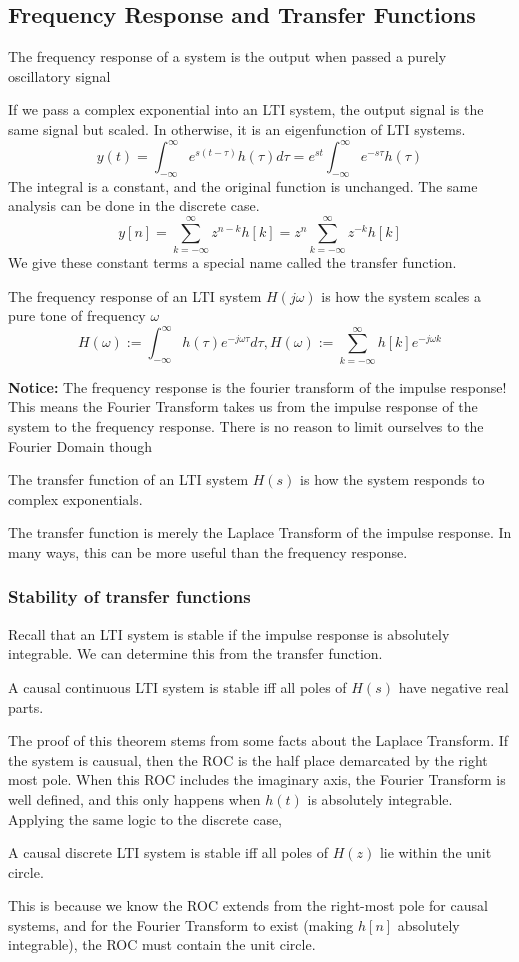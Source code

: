 \subsection{Frequency Response and Transfer Functions}
\begin{definition}
    The frequency response of a system is the output when passed a purely oscillatory signal
\end{definition}
If we pass a complex exponential into an LTI system, the output signal is the same signal but scaled.
In otherwise, it is an eigenfunction of LTI systems.
\[
y(t)=\int_{-\infty}^{\infty}{e^{s(t-\tau)}h(\tau)d\tau}=e^{st}\int_{-\infty}^{\infty}{e^{-s\tau}h(\tau)}
\]
The integral is a constant, and the original function is unchanged.
The same analysis can be done in the discrete case.
\[
y[n]=\sum_{k=-\infty}^{\infty}z^{n-k}h[k] = z^n \sum_{k=-\infty}^{\infty}z^{-k}h[k]
\]
We give these constant terms a special name called the transfer function.
\begin{definition}
    The frequency response of an LTI system $H(j\omega)$ is how the system scales a pure tone of frequency $\omega$
    \[
H(\omega):=\int_{-\infty}^{\infty}{h(\tau)e^{-j\omega\tau}d\tau}, H(\omega):= \sum_{k=-\infty}^{\infty}{h[k]e^{-j\omega k}}
\]
\end{definition}
\textbf{Notice: }The frequency response is the fourier transform of the impulse response!
This means the Fourier Transform takes us from the impulse response of the system to the frequency response.
There is no reason to limit ourselves to the Fourier Domain though
\begin{definition}
    The transfer function of an LTI system $H(s)$ is how the system responds to complex exponentials.
\end{definition}
The transfer function is merely the Laplace Transform of the impulse response. In many ways, this can be more useful than the frequency response.
\subsubsection{Stability of transfer functions}
Recall that an LTI system is stable if the impulse response is absolutely integrable. We can determine this from the transfer function.
\begin{theorem}
    A causal continuous LTI system is stable iff all poles of $H(s)$ have negative real parts.
\end{theorem}

The proof of this theorem stems from some facts about the Laplace Transform. If the system is causual, then the ROC is the half place demarcated by the right most pole.
When this ROC includes the imaginary axis, the Fourier Transform is well defined, and this only happens when $h(t)$ is absolutely integrable.
Applying the same logic to the discrete case,
\begin{theorem}
    A causal discrete LTI system is stable iff all poles of $H(z)$ lie within the unit circle.
\end{theorem}
This is because we know the ROC extends from the right-most pole for causal systems, and for the Fourier Transform to exist (making $h[n]$ absolutely integrable), the ROC must contain the unit circle.
